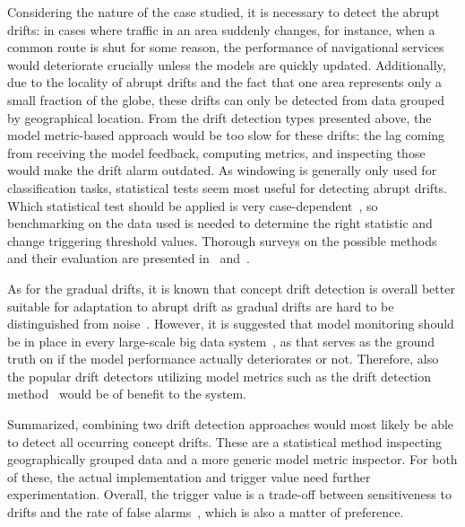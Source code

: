 Considering the nature of the case studied, it is necessary to detect the abrupt drifts: in cases where traffic in an area suddenly changes, for instance, when a common route is shut for some reason, the performance of navigational services would deteriorate crucially unless the models are quickly updated. Additionally, due to the locality of abrupt drifts and the fact that one area represents only a small fraction of the globe, these drifts can only be detected from data grouped by geographical location. From the drift detection types presented above, the model metric-based approach would be too slow for these drifts: the lag coming from receiving the model feedback, computing metrics, and inspecting those would make the drift alarm outdated. As windowing is generally only used for classification tasks, statistical tests seem most useful for detecting abrupt drifts. Which statistical test should be applied is very case-dependent~\cite{faithfullUnsupervisedChangeDetection2018}, so benchmarking on the data used is needed to determine the right statistic and change triggering threshold values. Thorough surveys on the possible methods and their evaluation are presented in~\cite{conceptdriftsurvey} and~\cite{faithfullUnsupervisedChangeDetection2018}.

As for the gradual drifts, it is known that concept drift detection is overall better suitable for adaptation to abrupt drift as gradual drifts are hard to be distinguished from noise~\cite{zliobaiteAdaptiveTrainingSet2010}. However, it is suggested that model monitoring should be in place in every large-scale big data system~\cite{googlemlops}, as that serves as the ground truth on if the model performance actually deteriorates or not. Therefore, also the popular drift detectors utilizing model metrics such as the drift detection method~\cite{gamaLearningDriftDetection2004} would be of benefit to the system.

Summarized, combining two drift detection approaches would most likely be able to detect all occurring concept drifts. These are a statistical method inspecting geographically grouped data and a more generic model metric inspector. For both of these, the actual implementation and trigger value need further experimentation. Overall, the trigger value is a trade-off between sensitiveness to drifts and the rate of false alarms~\cite{faithfullUnsupervisedChangeDetection2018}, which is also a matter of preference.

